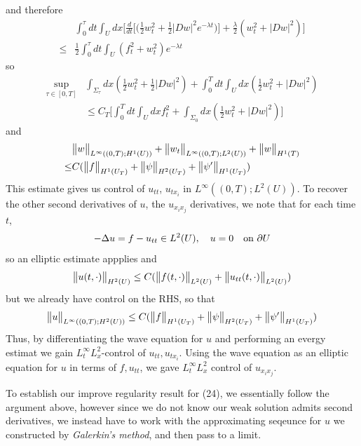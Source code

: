\documentclass[12pt,a4paper]{report}
\begin{document}
and therefore
\begin{align*}
& \int_0^{\tau}dt \int_U dx \Big[  \frac{d}{dt}\Big[ \Big( \frac{1}{2}w_t^2 + \frac{1}{2}|Dw|^2 e^{-\lambda t} \Big)  \Big] + \frac{\lambda}{2}(w_t^2 + |Dw|^2)\Big]\\
\leq & \frac{1}{2}\int_0^{\tau}dt \int_U (f_t^2+w_t^2)e^{-\lambda t}
\end{align*}
so
\begin{align*}
\sup_{\tau\in [0,T]} & \int_{\Sigma_{\tau}}dx (\frac{1}{2}w_{t}^2 + \frac{1}{2}|Dw|^2) + \int_0^T dt \int_U dx (\frac{1}{2} w_t^2 + |Dw|^2)\\
& \leq C_T \Big[ \int_0^T dt \int_U dx f_t^2 + \int_{\Sigma_0}dx (\frac{1}{2}w_t^2 + |Dw|^2)\Big]
\end{align*}
and
\begin{align*}
& \bigl\lVert w\bigr\rVert_{L^{\infty}((0,T); H^1(U)) } + \bigl\lVert w_t\bigr\rVert_{L^{\infty}((0,T);L^2(U))}+ \bigl\lVert w\bigr\rVert_{H^1(T)}\\
\leq & C(\bigl\lVert f\bigr\rVert_{H^1(U_T)} + \bigl\lVert\psi\bigr\rVert_{H^2(U_T)}+\bigl\lVert\psi'\bigr\rVert_{H^1(U_T)})
\end{align*}
This estimate gives us control of $u_{tt}$, $u_{tx_i}$ in $L^{\infty}((0,T); L^2(U))$. To recover the other second derivatives of $u$, the $u_{x_i x_j}$ derivatives, we note that for each time $t$,
\begin{align*}
-\Delta u = f - u_{tt}\in L^2(U),\quad u=0 \quad \text{on }\partial U
\end{align*}
so an elliptic estimate appplies and
\begin{align*}
\bigl\lVert u(t, \cdot)\bigr\rVert_{H^2(U)}\leq C (\bigl\lVert f(t, \cdot)\bigr\rVert_{L^2(U)} + \bigl\lVert u_{tt}(t, \cdot)\bigr\rVert_{L^2(U)})
\end{align*}
but we already have control on the RHS, so that
\begin{align*}
\bigl\lVert u\bigr\rVert_{L^{\infty}((0, T); H^2(U))}\leq C(\bigl\lVert f\bigr\rVert_{H^1(U_T)} + \bigl\lVert\psi\bigr\rVert_{H^2(U_T)}+ \bigl\lVert\psi'\bigr\rVert_{H^1(U_T)})
\end{align*}
Thus, by differentiating the wave equation for $u$ and performing an evergy estimat we gain $L_t^{\infty}L_x^2$-control of $u_{tt}, u_{tx_i}$. Using the wave equation as an elliptic equation for $u$ in terms of $f, u_{tt}$, we gave $L_t^{\infty}L_x^{2}$ control of $u_{x_i x_j}$.
\s

\quad To establish our improve regularity result for (24), we essentially follow the argument above, however since we do not know our weak solution admits second derivatives, we instead have to work with the approximating seqeunce for $u$ we constructed by \emph{Galerkin's method}, and then pass to a limit.
\s
\end{document}
